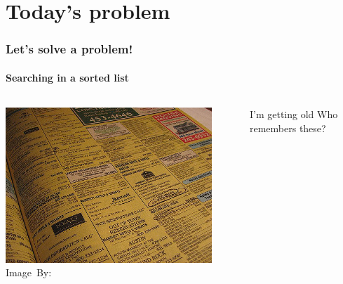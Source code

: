 \section{Today's problem}
\label{sec:today_s_problem}

\begin{frame}
	\frametitle{Let's solve a problem!}
	\framesubtitle{Searching in a sorted list}
	
	\begin{columns}
	\begin{center}
		\includegraphics[width=0.9\textwidth]{figures/phonebook.jpg}\\
		\hspace*{15pt}\hbox{\scriptsize Image By:}
	\end{center}
		\begin{questionblock}{I'm getting old}
			Who remembers these?
		\end{questionblock}
			
	\end{columns}
\end{frame}

